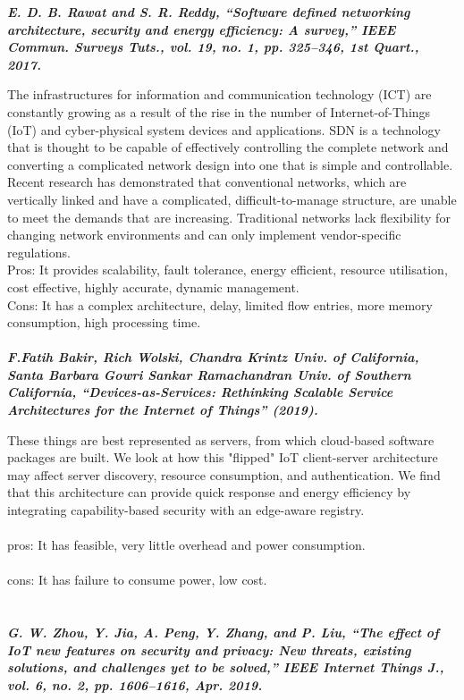 \documentclass[12pt,a4paper,twocolumn,fleqn]{article}
\begin{document}
\textbf{\emph {E. D. B. Rawat and S. R. Reddy, “Software defined networking architecture, security and energy efficiency: A survey,” IEEE Commun. Surveys Tuts., vol. 19, no. 1, pp. 325–346, 1st Quart., 2017.}}

The infrastructures for information and communication technology (ICT) are constantly growing as a result of the rise in the number of Internet-of-Things (IoT) and cyber-physical system devices and applications. SDN is a technology that is thought to be capable of effectively controlling the complete network and converting a complicated network design into one that is simple and controllable. Recent research has demonstrated that conventional networks, which are vertically linked and have a complicated, difficult-to-manage structure, are unable to meet the demands that are increasing. Traditional networks lack flexibility for changing network environments and can only implement vendor-specific regulations.
 \\
Pros: It provides scalability, fault tolerance, energy efficient, resource utilisation, cost effective, highly accurate, dynamic management.
 \\
Cons: It has a complex architecture, delay, limited flow entries, more memory consumption, high processing time.
\\ \\
 
\textbf{\emph {F.Fatih Bakir, Rich Wolski, Chandra Krintz Univ. of California, Santa Barbara Gowri Sankar Ramachandran Univ. of Southern California, “Devices-as-Services: Rethinking Scalable Service Architectures for the Internet of Things” (2019).}}

These things are best represented as servers, from which cloud-based software packages are built. We look at how this "flipped" IoT client-server architecture may affect server discovery, resource consumption, and authentication. We find that this architecture can provide quick response and energy efficiency by integrating capability-based security with an edge-aware registry.
 \\ \\
pros: It has feasible, very little overhead and power consumption.
 \\ \\
cons: It has failure to consume power, low cost.
\\ \\ \\ 
 
\textbf{\emph {G.  W. Zhou, Y. Jia, A.   Peng, Y. Zhang, and P. Liu, “The effect of IoT new features on security and privacy: New threats, existing solutions, and challenges yet to be solved,” IEEE Internet Things J., vol. 6, no. 2, pp. 1606–1616, Apr. 2019.}}
\end{document}
